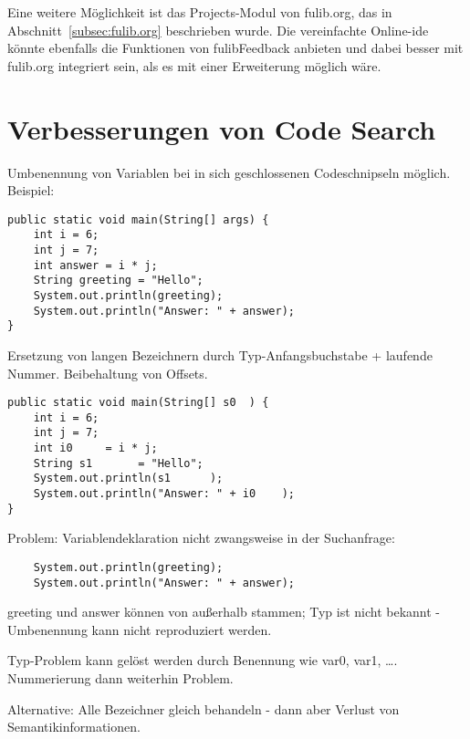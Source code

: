 Eine weitere Möglichkeit ist das Projects-Modul von fulib.org, das in Abschnitt~\ref{subsec:fulib.org} beschrieben wurde.
Die vereinfachte Online-\ac{ide} könnte ebenfalls die Funktionen von fulibFeedback anbieten und dabei besser mit fulib.org integriert sein, als es mit einer Erweiterung möglich wäre.


\section{Verbesserungen von Code Search}\label{sec:code-search-improvements}


Umbenennung von Variablen bei in sich geschlossenen Codeschnipseln möglich.
Beispiel:

\begin{verbatim}
public static void main(String[] args) {
    int i = 6;
    int j = 7;
    int answer = i * j;
    String greeting = "Hello";
    System.out.println(greeting);
    System.out.println("Answer: " + answer);
}
\end{verbatim}

Ersetzung von langen Bezeichnern durch Typ-Anfangsbuchstabe + laufende Nummer.
Beibehaltung von Offsets.

\begin{verbatim}
public static void main(String[] s0  ) {
    int i = 6;
    int j = 7;
    int i0     = i * j;
    String s1       = "Hello";
    System.out.println(s1      );
    System.out.println("Answer: " + i0    );
}
\end{verbatim}

Problem: Variablendeklaration nicht zwangsweise in der Suchanfrage:

\begin{verbatim}
    System.out.println(greeting);
    System.out.println("Answer: " + answer);
\end{verbatim}

greeting und answer können von außerhalb stammen;
Typ ist nicht bekannt -
Umbenennung kann nicht reproduziert werden.

Typ-Problem kann gelöst werden durch Benennung wie var0, var1, \ldots.
Nummerierung dann weiterhin Problem.

Alternative: Alle Bezeichner gleich behandeln - dann aber Verlust von Semantikinformationen.
